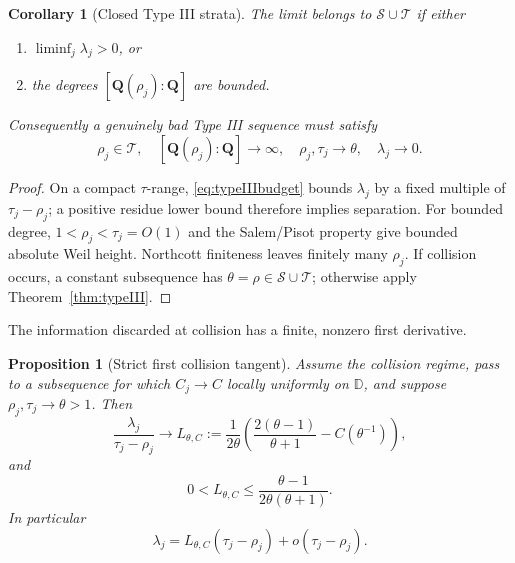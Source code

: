 \documentclass[11pt,reqno]{amsart}
\newtheorem{proposition}[theorem]{Proposition}
\newtheorem{corollary}[theorem]{Corollary}
\theoremstyle{definition}
\theoremstyle{remark}
\newcommand{\D}{\mathbb D}
\newcommand{\Q}{\mathbf Q}
\newcommand{\calS}{\mathcal S}
\newcommand{\calT}{\mathcal T}
\begin{document}
\begin{corollary}[Closed Type III strata]\label{cor:typeIIIstrata}
The limit belongs to $\calS\cup\calT$ if either
\begin{enumerate}[label=\textup{(\roman*)}]
\item $\liminf_j\lambda_j>0$, or
\item the degrees $[\Q(\rho_j):\Q]$ are bounded.
\end{enumerate}
Consequently a genuinely bad Type III sequence must satisfy
\begin{equation}\label{eq:twin}
 \rho_j\in\calT,\quad [\Q(\rho_j):\Q]\to\infty,\quad
 \rho_j,\tau_j\to\theta,\quad \lambda_j\to0.
\end{equation}
\end{corollary}

\begin{proof}
On a compact $\tau$-range, \eqref{eq:typeIIIbudget} bounds $\lambda_j$ by a
fixed multiple of $\tau_j-\rho_j$; a positive residue lower bound therefore
implies separation.  For bounded degree, $1<\rho_j<\tau_j=O(1)$ and the
Salem/Pisot property give bounded absolute Weil height.  Northcott finiteness
\cite{northcott} leaves finitely many $\rho_j$.  If collision occurs, a
constant subsequence has $\theta=\rho\in\calS\cup\calT$; otherwise apply
Theorem~\ref{thm:typeIII}.
\end{proof}

The information discarded at collision has a finite, nonzero first
derivative.

\begin{proposition}[Strict first collision tangent]\label{prop:tangent}
Assume the collision regime, pass to a subsequence for which $C_j\to C$
locally uniformly on $\D$, and suppose $\rho_j,\tau_j\to\theta>1$.  Then
\begin{equation}\label{eq:tangent}
 \frac{\lambda_j}{\tau_j-\rho_j}\longrightarrow
 L_{\theta,C}:=\frac1{2\theta}
 \left(\frac{2(\theta-1)}{\theta+1}-C(\theta^{-1})\right),
\end{equation}
and
\begin{equation}\label{eq:tangentwindow}
 0<L_{\theta,C}\le
 \frac{\theta-1}{2\theta(\theta+1)}.
\end{equation}
In particular
\[
 \lambda_j=L_{\theta,C}(\tau_j-\rho_j)
 +o(\tau_j-\rho_j).
\]
\end{proposition}
\end{document}
